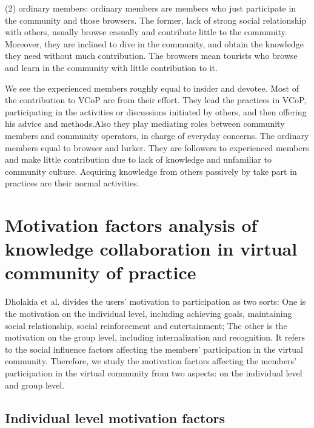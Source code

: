 \documentclass{elsarticle}
\begin{document}
(2)  ordinary members: ordinary members are members who just
participate in the community and those browsers. The former, lack of
strong social relationship with others, usually browse casually and
contribute little to the community. Moreover, they are inclined to
dive in the community, and obtain the knowledge they need without much
contribution. The browsers mean tourists who browse and learn in the
community with little contribution to it. 

We see the  experienced members roughly equal to insider and
devotee. Most of the contribution to VCoP are from their effort. They
lead the practices in VCoP, participating in the activities or
discussions initiated by others, and then offering his advice and
methods.Also they play mediating roles between community members and community operators, in charge of everyday concerns.
 The ordinary members equal to browser and lurker. They are followers
 to experienced members and make little contribution due to lack of
 knowledge and unfamiliar to community culture. Acquiring knowledge
 from others passively by take part in practices are their normal activities.



\section{Motivation factors analysis of knowledge collaboration in virtual community of practice}
\label{sec:motiv-fact-analys}


 Dholakia et al. \cite{Dholakia2004241}divides the users’ motivation to participation as two sorts: One is the motivation on the individual level, including achieving goals, maintaining social relationship, social reinforcement and entertainment; The other is the motivation on the group level, including internalization and recognition. It refers to the social influence factors affecting the members’ participation in the virtual community. Therefore, we study the motivation factors affecting the members’ participation in the virtual community from two aspects: on the individual level and group level.  

\subsection{Individual level motivation factors}
\label{sec:individual-level}
\end{document}
